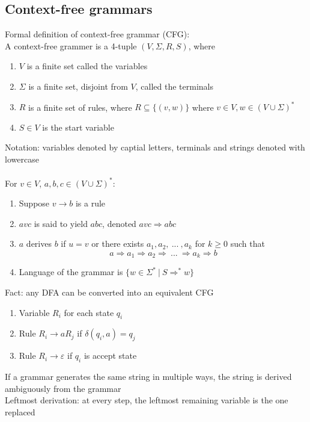 \documentclass{article}
\newcommand*{\<}{\langle}
\renewcommand*{\>}{\rangle}
\begin{document}
		\subsection{Context-free grammars}
			Formal definition of context-free grammar (CFG): \\
			A context-free grammer is a 4-tuple $(V, \Sigma, R, S)$, where
			\begin{enumerate}
				\item $V$ is a finite set called the variables
				\item $\Sigma$ is a finite set, disjoint from $V$, called the terminals
				\item $R$ is a finite set of rules, where $R \subseteq \{(v, w)\}$ where $v \in V, w \in (V \cup \Sigma)^*$
				\item $S \in V$ is the start variable
				\end{enumerate}
			Notation: variables denoted by captial letters, terminals and strings denoted with lowercase \\
			\\
			For $v \in V$, $a, b, c \in (V \cup \Sigma)^*$:
			\begin{enumerate}
				\item Suppose $v \to b$ is a rule
				\item $avc$ is said to yield $abc$, denoted $avc \Rightarrow abc$
				\item $a$ derives $b$ if $u = v$ or there exists $a_1, a_2,\:...\:, a_k$ for $k \geq 0$ such that
				\begin{equation*}
					a \Rightarrow a_1 \Rightarrow a_2 \Rightarrow\:...\:\Rightarrow a_k \Rightarrow b
					\end{equation*}
				\item Language of the grammar is $\{w \in \Sigma^*\:|\:S \Rightarrow^* w\}$
				\end{enumerate}
			Fact: any DFA can be converted into an equivalent CFG
			\begin{enumerate}
				\item Variable $R_i$ for each state $q_i$
				\item Rule $R_i \to aR_j$ if $\delta(q_i, a) = q_j$
				\item Rule $R_i \to \varepsilon$ if $q_i$ is accept state
				\end{enumerate}
			If a grammar generates the same string in multiple ways, the string is derived ambiguously from the grammar \\
			Leftmost derivation: at every step, the leftmost remaining variable is the one replaced \\
\end{document}
